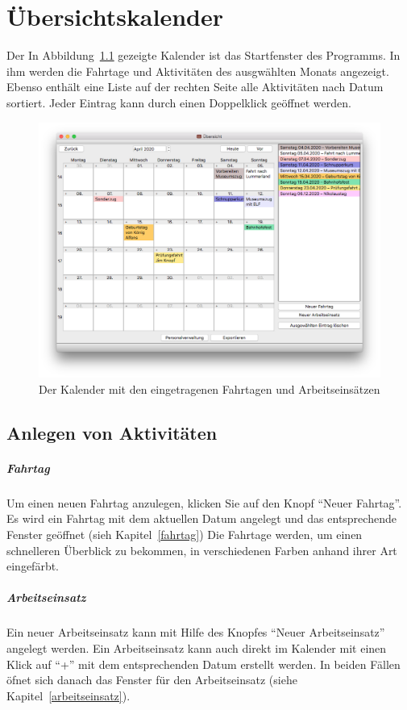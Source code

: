 \chapter{Übersichtskalender}\label{kalender}
Der In Abbildung~\ref{fig:kalender} gezeigte Kalender ist das Startfenster des Programms.
In ihm werden die Fahrtage und Aktivitäten des ausgwählten Monats angezeigt.
Ebenso enthält eine Liste auf der rechten Seite alle Aktivitäten nach Datum sortiert.
Jeder Eintrag kann durch einen Doppelklick geöffnet werden.

\begin{figure}[h!]
  \includegraphics[width=\textwidth]{img/kalender}
  \caption{Der Kalender mit den eingetragenen Fahrtagen und Arbeitseinsätzen}
  \label{fig:kalender}
\end{figure}



\section{Anlegen von Aktivitäten}\label{kalender:anlegen}
\paragraph{Fahrtag}
Um einen neuen Fahrtag anzulegen, klicken Sie auf den Knopf "`Neuer Fahrtag"'.
Es wird ein Fahrtag mit dem aktuellen Datum angelegt und das entsprechende Fenster geöffnet (sieh Kapitel~\ref{fahrtag})
Die Fahrtage werden, um einen schnelleren Überblick zu bekommen, in verschiedenen Farben anhand ihrer Art eingefärbt.

\paragraph{Arbeitseinsatz}
Ein neuer Arbeitseinsatz kann mit Hilfe des Knopfes "`Neuer Arbeitseinsatz"' angelegt werden.
Ein Arbeitseinsatz kann auch direkt im Kalender mit einen Klick auf ``+'' mit dem entsprechenden Datum erstellt werden.
In beiden Fällen öfnet sich danach das Fenster für den Arbeitseinsatz (siehe Kapitel~\ref{arbeitseinsatz}).




